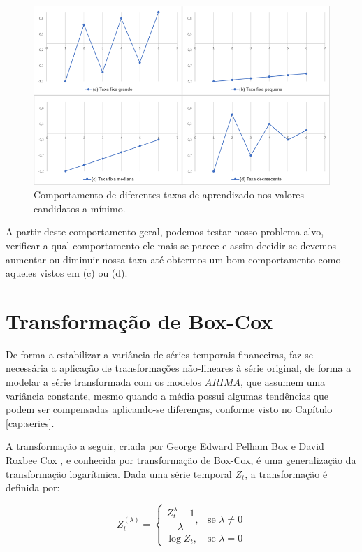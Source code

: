 \begin{figure}[htb]
\centering
\includegraphics[width=14cm]{figuras/grad_4}
\caption{Comportamento de diferentes taxas de aprendizado nos valores candidatos a mínimo.}
\label{fig:grad_4}
\end{figure}

A partir deste comportamento geral, podemos testar nosso problema-alvo, verificar a qual comportamento ele mais se parece e assim decidir se devemos aumentar ou diminuir nossa taxa até obtermos um bom comportamento como aqueles vistos em (c) ou (d).



\chapter{Transformação de Box-Cox}
\label{ap:box-cox}

De forma a estabilizar a variância de séries temporais financeiras, faz-se necessária a aplicação de transformações não-lineares à série original, de forma a modelar a série transformada com os modelos $ARIMA$, que assumem uma variância constante, mesmo quando a média possui algumas tendências que podem ser compensadas aplicando-se diferenças, conforme visto no Capítulo \ref{cap:series}.

A transformação a seguir, criada por George Edward Pelham Box e David Roxbee Cox \citep{cox}, e conhecida por transformação de Box-Cox, é uma generalização da transformação logarítmica. Dada uma série temporal $Z_t$, a transformação é definida por:

\begin{equation}\label{eq:cox}
Z_t^{(\lambda)} = \left\{ \begin{array}{lr}\dfrac{Z_t^\lambda - 1}{\lambda},& \text{se } \lambda \neq 0\\\log{Z_t},& \text{se } \lambda = 0\end{array} \right.
\end{equation}

